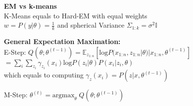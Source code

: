     \textbf{EM vs k-means}\\\hangindent=0.5cm
    K-Means equals to Hard-EM with equal weights \\
    $w=P(y|\theta)=\frac{1}{k}$ and spherical Variance $\Sigma_{1:k}=\sigma^2\mathbb{I}$
    
    \smallskip
    \textbf{General Expectation Maximation:}\\
    E-Step: $Q(\theta;\theta^{(t-1)})= \mathbb{E}_{z_{1:n}}\left[\mathrm{log} P(x_{1:n},z_{1:n}|\theta)| x_{1:n},\theta^{(t-1)}\right]$\\
    $=\sum_i\sum_{z_i}\gamma_{z_i}(x_i)\mathrm{log}P(z_i|\theta)P(x_i|z_i,\theta)$\\
    which equals to computing $\gamma_z(x_i)=P(z|x,\theta^{(t-1)})$
    
    M-Step: $\theta^{(t)}= \mathrm{arg max}_\theta\; Q(\theta;\theta^{(t-1)})$